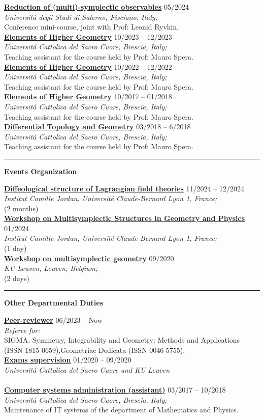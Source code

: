 \documentclass[a4paper]{article}
\newcommand{\block}[1]{\hrule \vspace{0.2cm} \textbf{\Large #1} \vspace{0.2cm}}
\newcommand{\voice}[5]{\href{#4}{\textbf{#1}} \hfill #2 \\ \textit{#3} \\ {\small #5} \vspace{0.2cm} \\}
\begin{document}
    
    \voice{Reduction of (multi)-symplectic observables}
        {05/2024}
        {Universit\'a degli Studi di Salerno, Fisciano, Italy;}
        {https://www.antoniomiti.it/teaching/Obs-Constraint-2024/}       
        {Conference mini-course, joint with Prof: Leonid Ryvkin.}
    \voice{Elements of Higher Geometry}
        {10/2023 -- 12/2023}
        {Universit\'a Cattolica del Sacro Cuore, Brescia, Italy;}
        {https://dmf.unicatt.it/miti/teaching/IstGeoSup-22-23/}       
        {Teaching assistant for the course held by Prof: Mauro Spera.}
    \voice{Elements of Higher Geometry}
        {10/2022 -- 12/2022}
        {Universit\'a Cattolica del Sacro Cuore, Brescia, Italy;}
        {https://dmf.unicatt.it/miti/teaching/IstGeoSup-22-23/}       
        {Teaching assistant for the course held by Prof: Mauro Spera.}
    \voice{Elements of Higher Geometry}
        {10/2017 -- 01/2018}
        {Universit\'a Cattolica del Sacro Cuore, Brescia, Italy;}
        {http://docenti.unicatt.it/web/html/index.html\#/programmi/BS/2D9B/75017/2017/21065/MIH341/ita}       
        {Teaching assistant for the course held by Prof: Mauro Spera.}
    \voice{Differential Topology and Geometry}
        {03/2018 -- 6/2018}
        {Universit\'a Cattolica del Sacro Cuore, Brescia, Italy;}
        {http://docenti.unicatt.it/web/html/index.html\#/programmi/BS/2D8B/75017/2017/21065/MGH344/ita}       
        {Teaching assistant for the course held by Prof: Mauro Spera.}


    \block{Events Organization}

    
    \voice{Diffeological structure of Lagrangian field theories}
        {11/2024 -- 12/2024}
        {Institut Camille Jordan, Université Claude-Bernard Lyon 1, France;}
        {https://www.antoniomiti.it/teaching/LFT-2024/}       
        {(2 months)}
    \voice{Workshop on Multisymplectic Structures in Geometry and Physics}
        {01/2024}
        {Institut Camille Jordan, Université Claude-Bernard Lyon 1, France;}
        {https://math.gmu.edu/~cblacke/lyon.html}       
        {(1 day)}
    \voice{Workshop on multisymplectic geometry}
        {09/2020}
        {KU Leuven, Leuven, Belgium;}
        {https://wis.kuleuven.be/events/multisymplectic}       
        {(2 days)}



    \block{Other Departmental Duties}

    
    \voice{Peer-reviewer}
        {06/2023 -- Now}
        {Referee for:}
        {}       
        {SIGMA. Symmetry, Integrability and Geometry: Methods and Applications (ISSN 1815-0659),Geometriae Dedicata (ISSN 0046-5755).}
    \voice{Exams supervision}
        {01/2020 -- 09/2020}
        {Universit\'a Cattolica del Sacro Cuore and KU Leuven}
        {}       
        {\vspace{-0.5cm}}
    \voice{Computer systems administration (assistant)}
        {03/2017 -- 10/2018}
        {Universit\'a Cattolica del Sacro Cuore, Brescia, Italy;}
        {https://dipartimenti.unicatt.it/dmf-home}       
        {Maintenance of IT systems of the department of Mathematics and Physics.}
	
\end{document}

